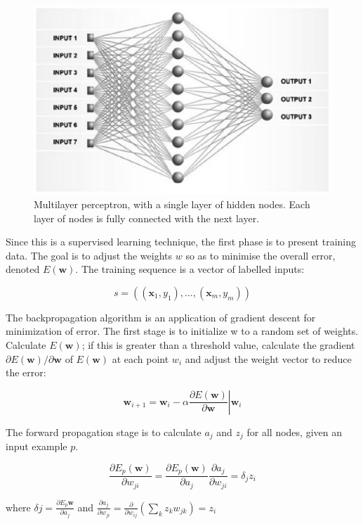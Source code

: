 \documentclass[12pt,a4,notitlepage]{report}
\renewcommand{\_}{\texttt{\symbol{95}}}
\newcommand{\<}{\texttt{\symbol{60}}}
\renewcommand{\>}{\texttt{\symbol{62}}}
\begin{document}
\begin{figure}
\centering
\includegraphics[scale=0.6,angle=0]{diagrams/neural.ps}
\caption{Multilayer perceptron, with a single layer of hidden nodes. Each layer of nodes is fully connected with the next layer.}
\label{mlp}
\end{figure}

Since this is a supervised learning technique, the first phase is to present training data. The goal is to adjust the weights $w$ so as to minimise the overall error, denoted ${E}(\mathbf w)$. The training sequence is a vector of labelled inputs:

\[ s = ((\mathbf x_1,y_1), ... , (\mathbf x_m, y_m)) \]

The backpropagation algorithm is an application of gradient descent for minimization of error\cite{NeuralPat}. The first stage is to initialize w to a random set of weights. Calculate $E (\mathbf w)$; if this is greater than a threshold value, calculate the gradient $\partial E (\mathbf w) / \partial \mathbf w $ of $E(\mathbf w )$ at each point $w_i$ and adjust the weight vector to reduce the error:

\[
\mathbf w_{i+1} = \mathbf w_i - \alpha \left. \frac {\partial E(\mathbf w)} {\partial \mathbf w} \right| \mathbf w_i
\]

The forward propagation stage is to calculate $a_j$ and $z_j$ for all nodes, given an input example $p$.

\[
\frac {\partial E_p(\mathbf w)} {\partial w_{ji}} = \frac {\partial E_p(\mathbf w)} {\partial a_j} \frac {\partial a_j} {\partial w_{ji}} = \delta_j z_i
\]

where $\delta j = \frac {\partial E_p\mathbf w} {\partial a_j}$
and $ \frac {\partial a_j} {\partial w_{ji}} = \frac {\partial} {\partial w_{ij}} \left( \sum_k {z_kw_{jk}} \right) = z_i$
\end{document}

